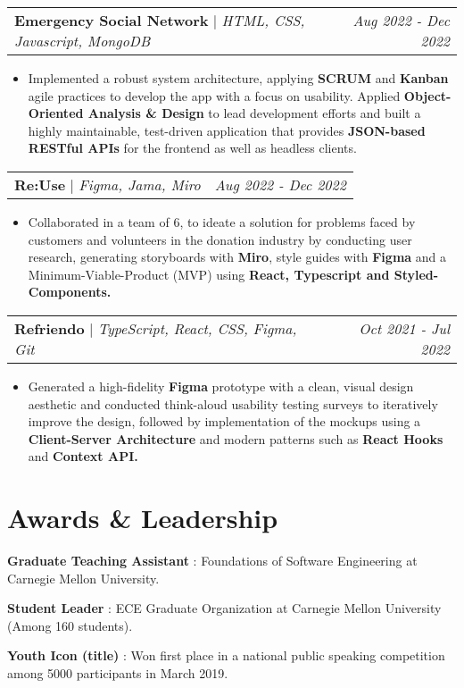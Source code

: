 \documentclass[letterpaper]{article}
\makeatletter
\newcommand{\resumeItemWithoutTitle}[1]{
  \item\small{
    {#1 \vspace{-2pt}}
  }
}
\newcommand{\shortSection}[1]{
    \vspace{-6pt}
    \section{#1}
}
\newcommand{\projectHeading}[3]{
  \begin{tabular*}{\textwidth}{l@{\extracolsep{\fill}}r}
        \textbf{#1} 
        \hspace{-2pt} $\vert$ \hspace{-2pt} \small{\textit{#2}} 
        & 
        \textit{#3} \\
    \end{tabular*}\vspace{-2pt}
}
\newcommand*{\skill}[2]{
  \textbf{#1} : #2 \\
  \vspace{1pt}
}
\newcommand{\resumeItemListStart}{\begin{itemize}}
\newcommand{\resumeItemListEnd}{\end{itemize}}
\makeatother
\begin{document}
\vspace{3pt}
\projectHeading {Emergency Social Network}{HTML, CSS, Javascript, MongoDB}{Aug 2022 - Dec 2022}
\resumeItemListStart
\resumeItemWithoutTitle{Implemented a robust system architecture, applying \textbf{SCRUM} and \textbf{Kanban} agile practices to develop the app with a focus on usability. Applied \textbf{Object-Oriented Analysis \& Design} to lead development efforts and built a highly maintainable, test-driven application that provides \textbf{JSON-based RESTful APIs} for the frontend as well as headless clients.}
\resumeItemListEnd

\vspace{3pt}
\projectHeading {Re:Use}{Figma, Jama, Miro}{Aug 2022 - Dec 2022}
\resumeItemListStart
\resumeItemWithoutTitle{Collaborated in a team of 6, to ideate a solution for problems faced by customers and volunteers in the donation industry by conducting user research, generating storyboards with \textbf{Miro}, style guides with \textbf{Figma} and a Minimum-Viable-Product (MVP) using \textbf{React, Typescript and Styled-Components.}}
\resumeItemListEnd

\vspace{3pt}
\projectHeading {Refriendo}{TypeScript, React, CSS, Figma, Git}{Oct 2021 - Jul 2022}
\resumeItemListStart
\resumeItemWithoutTitle{Generated a high-fidelity \textbf{Figma} prototype with a clean, visual design aesthetic and conducted think-aloud usability testing surveys to iteratively improve the design, followed by implementation of the mockups using a \textbf{Client-Server Architecture} and modern patterns such as \textbf{React Hooks} and \textbf{Context API.}}
\resumeItemListEnd

\shortSection{Awards \& Leadership}
\skill {Graduate Teaching Assistant}{Foundations of Software Engineering at Carnegie Mellon University.}
\skill {Student Leader}{ ECE Graduate Organization at Carnegie Mellon University (Among 160 students).}
\skill {Youth Icon (title)}{Won first place in a national public speaking competition among 5000 participants in March 2019.}
\end{document}
